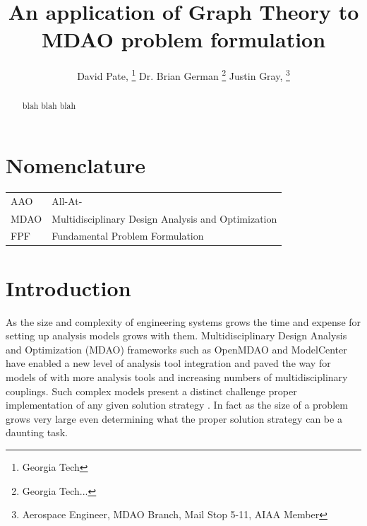 \documentclass[]{aiaa-tc} %
\title{An application of Graph Theory to MDAO problem formulation}
\author{
  David Pate, %
     \thanks{Georgia Tech}
  Dr. Brian German 
     \thanks{Georgia Tech...}
  Justin Gray,%
     \thanks{Aerospace Engineer, MDAO Branch, Mail Stop 5-11, AIAA Member}   
 }
\begin{document}
\maketitle
 
\begin{abstract}
   blah blah blah
\end{abstract}

\section*{Nomenclature}

\begin{tabular}{l l} 
    AAO      & All-At- \\
    MDAO     & Multidisciplinary Design Analysis and Optimization \\
    FPF      & Fundamental Problem Formulation \\
\end{tabular}


\section{Introduction}
    
    As the size and complexity of engineering systems grows the time and expense for setting up 
    analysis models grows with them. Multidisciplinary Design Analysis and Optimization (MDAO)
    frameworks such as OpenMDAO\cite{Gray2012} and ModelCenter have enabled a new level of analysis tool integration 
    and paved the way for models of with more analysis tools and increasing numbers of multidisciplinary couplings. 
    Such complex models present a distinct challenge proper implementation of any given solution strategy . 
    In fact as the size of a problem grows very large even determining what the proper solution strategy can be a daunting 
    task. 
\end{document}
